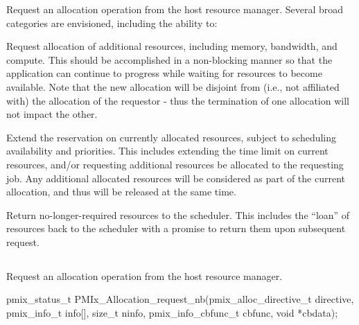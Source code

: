 Request an allocation operation from the host resource manager.
Several broad categories are envisioned, including the ability to:

\begin{compactitem}
%
\item Request allocation of additional resources, including memory, bandwidth, and compute.
This should be accomplished in a non-blocking manner so that the application can continue to progress while waiting for resources to become available.
Note that the new allocation will be disjoint from (i.e., not affiliated with) the allocation of the requestor - thus the termination of one allocation will not impact the other.
%
\item Extend the reservation on currently allocated resources, subject to scheduling availability and priorities.
This includes extending the time limit on current resources, and/or requesting additional resources be allocated to the requesting job.
Any additional allocated resources will be considered as part of the current allocation, and thus will be released at the same time.
%
\item Return no-longer-required resources to the scheduler.
This includes the ``loan'' of resources back to the scheduler with a promise to return them upon subsequent request.
\end{compactitem}

\subsection{}

\summary

Request an allocation operation from the host resource manager.

\format

\cspecificstart
\begin{codepar}
pmix_status_t
PMIx_Allocation_request_nb(pmix_alloc_directive_t directive,
                           pmix_info_t info[], size_t ninfo,
                           pmix_info_cbfunc_t cbfunc, void *cbdata);
\end{codepar}
\cspecificend

\begin{arglist}
\end{arglist}

